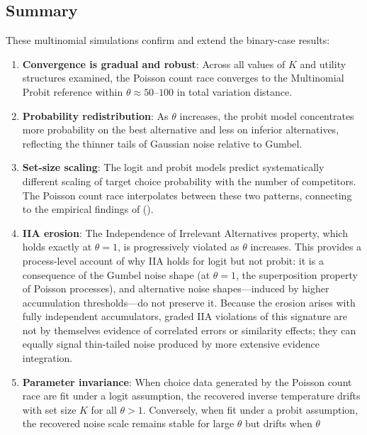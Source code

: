 \documentclass[
  man,
  floatsintext,
  longtable,
  a4paper,
  nolmodern,
  notxfonts,
  notimes,
  colorlinks=true,linkcolor=blue,citecolor=blue,urlcolor=blue]{apa7}
\begin{document}
\subsection{Summary}\label{summary}

These multinomial simulations confirm and extend the binary-case
results:

\begin{enumerate}
\def\labelenumi{\arabic{enumi}.}
\item
  \textbf{Convergence is gradual and robust}: Across all values of \(K\)
  and utility structures examined, the Poisson count race converges to
  the Multinomial Probit reference within \(\theta \approx 50\)--\(100\)
  in total variation distance.
\item
  \textbf{Probability redistribution}: As \(\theta\) increases, the
  probit model concentrates more probability on the best alternative and
  less on inferior alternatives, reflecting the thinner tails of
  Gaussian noise relative to Gumbel.
\item
  \textbf{Set-size scaling}: The logit and probit models predict
  systematically different scaling of target choice probability with the
  number of competitors. The Poisson count race interpolates between
  these two patterns, connecting to the empirical findings of
  ().
\item
  \textbf{IIA erosion}: The Independence of Irrelevant Alternatives
  property, which holds exactly at \(\theta = 1\), is progressively
  violated as \(\theta\) increases. This provides a process-level
  account of why IIA holds for logit but not probit: it is a consequence
  of the Gumbel noise shape (at \(\theta = 1\), the superposition
  property of Poisson processes), and alternative noise shapes---induced
  by higher accumulation thresholds---do not preserve it. Because the
  erosion arises with fully independent accumulators, graded IIA
  violations of this signature are not by themselves evidence of
  correlated errors or similarity effects; they can equally signal
  thin-tailed noise produced by more extensive evidence integration.
\item
  \textbf{Parameter invariance}: When choice data generated by the
  Poisson count race are fit under a logit assumption, the recovered
  inverse temperature drifts with set size \(K\) for all \(\theta > 1\).
  Conversely, when fit under a probit assumption, the recovered noise
  scale remains stable for large \(\theta\) but drifts when \(\theta\)

\end{enumerate}
\end{document}
